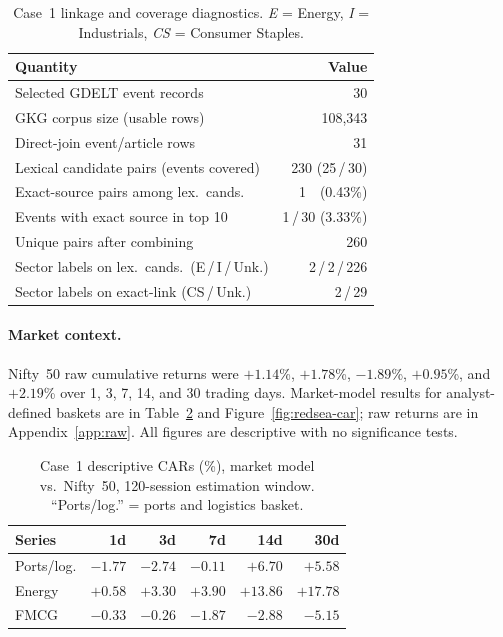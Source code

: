 \documentclass[10pt,a4paper,twocolumn]{article}
\begin{document}
\begin{table}[t]
\centering
\caption{Case~1 linkage and coverage diagnostics.
  \emph{E} = Energy, \emph{I} = Industrials, \emph{CS} = Consumer Staples.}
\label{tab:redsea-link}
\small
\begin{tabular}{@{}p{4.8cm}r@{}}
\toprule
\textbf{Quantity} & \textbf{Value} \\
\midrule
Selected GDELT event records           & 30 \\
GKG corpus size (usable rows)          & 108{,}343 \\
\addlinespace[2pt]
Direct-join event/article rows         & 31 \\
Lexical candidate pairs (events covered) & 230 (25\,/\,30) \\
Exact-source pairs among lex.\ cands.  & 1\ \ (0.43\%) \\
Events with exact source in top 10     & 1\,/\,30 (3.33\%) \\
Unique pairs after combining           & 260 \\
\addlinespace[2pt]
Sector labels on lex.\ cands.\ (E\,/\,I\,/\,Unk.) & 2\,/\,2\,/\,226 \\
Sector labels on exact-link (CS\,/\,Unk.) & 2\,/\,29 \\
\bottomrule
\end{tabular}
\end{table}

\paragraph{Market context.} Nifty~50 raw cumulative returns were
$+1.14$\%, $+1.78$\%, $-1.89$\%, $+0.95$\%, and $+2.19$\% over 1,
3, 7, 14, and 30 trading days. Market-model results for analyst-defined
baskets are in Table~\ref{tab:redsea-car} and Figure~\ref{fig:redsea-car};
raw returns are in Appendix~\ref{app:raw}. All figures are descriptive
with no significance tests.

\begin{table}[t]
\centering
\caption{Case~1 descriptive CARs (\%),
  market model vs.\ Nifty~50, 120-session estimation window.
  ``Ports/log.'' = ports and logistics basket.}
\label{tab:redsea-car}
\small
\begin{tabular}{@{}lrrrrr@{}}
\toprule
\textbf{Series} & \textbf{1d} & \textbf{3d} & \textbf{7d} &
  \textbf{14d} & \textbf{30d} \\
\midrule
Ports/log. & $-1.77$ & $-2.74$ & $-0.11$ & $+6.70$ & $+5.58$ \\
Energy     & $+0.58$ & $+3.30$ & $+3.90$ & $+13.86$ & $+17.78$ \\
FMCG       & $-0.33$ & $-0.26$ & $-1.87$ & $-2.88$  & $-5.15$ \\
\bottomrule
\end{tabular}
\end{table}
\end{document}
